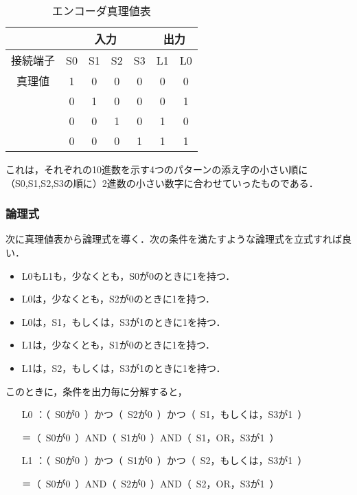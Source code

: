 \begin {table}[ht]
	\begin {center}
		\caption {エンコーダ真理値表}%
		\begin {tabular}{c|cccc|cc}\hline
			\multicolumn{1}{c|}{}&%
			\multicolumn{4}{c}{入力}&%
			\multicolumn{2}{|c}{出力}\\ %
			\hline
			\multicolumn{1}{c|}{接続端子}&%
			\multicolumn{1}{c}{S0}&%
			\multicolumn{1}{c}{S1}&%
			\multicolumn{1}{c}{S2}& %
			\multicolumn{1}{c}{S3}&%
			\multicolumn{1}{|c}{L1}&%
			\multicolumn{1}{c}{L0}\\%
			\hline
			真理値&1&0&0&0&0&0\\%
			&0&1&0&0&0&1\\%
			&0&0&1&0&1&0\\%
			&0&0&0&1&1&1\\
			\hline
		\end{tabular}
		\label {tab:encoder_shinrititab}%
	\end{center}
\end{table}

これは，それぞれの10進数を示す4つのパターンの添え字の小さい順に（S0,S1,S2,S3の順に）2進数の小さい数字に合わせていったものである．
%
%
\subsubsection{論理式}
次に真理値表から論理式を導く．次の条件を満たすような論理式を立式すれば良い．

\begin{itemize}
	\item L0もL1も，少なくとも，S0が0のときに1を持つ．
	\item L0は，少なくとも，S2が0のときに1を持つ．
	\item L0は，S1，もしくは，S3が1のときに1を持つ．
	\item L1は，少なくとも，S1が0のときに1を持つ．
	\item L1は，S2，もしくは，S3が1のときに1を持つ．
\end{itemize}

このときに，条件を出力毎に分解すると，

\begin{itemize}
	\item [L0] ：（~S0が0~）かつ（~S2が0~）かつ（~S1，もしくは，S3が1~）
	\item []＝（~S0が0~）AND（~S1が0~）AND（~S1，OR，S3が1~）
	\item [L1] ：（~S0が0~）かつ（~S1が0~）かつ（~S2，もしくは，S3が1~）
	\item []＝（~S0が0~）AND（~S2が0~）AND（~S2，OR，S3が1~）
\end{itemize}

